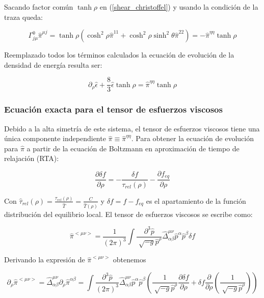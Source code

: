 \documentclass[11pt,a4paper]{article}
\begin{document}
Sacando factor común $\tanh\rho$ en (\ref{shear_christoffel}) y usando la condición de la traza queda:


\begin{equation}
\Gamma^{0}_{{j}{\mu}}\hat{\pi}^{{\mu}{j}}= \tanh\rho(\cosh^2\rho\hat{\pi}^{{1}{1}}+\cosh^2\rho\sinh^2\theta\hat{\pi}^{{2}{2}})=-\hat{\pi}^{{\eta}{\eta}}\tanh\rho
\end{equation}


Reemplazado todos los términos calculados la ecuación de evolución de la densidad de energía resulta ser:

\begin{equation}
\partial_{\rho}\hat{\epsilon}+\frac{8}{3}\hat{\epsilon}\tanh\rho=\hat{\pi}^{{\eta}{\eta}}\tanh\rho
\label{ecuacion_energia}
\end{equation}

\subsubsection{Ecuación exacta para el tensor de esfuerzos viscosos}

Debido a la alta simetría de este sistema, el tensor de esfuerzos viscosos tiene una única componente independiente $\hat{\pi}\equiv\hat{\pi}^{{\eta}{\eta}}$. Para obtener la ecuación de evolución para $\hat{\pi}$ a partir de la ecuación de Boltzmann en aproximación de tiempo de relajación (RTA):

\begin{equation}
\frac{\partial\delta{f}}{\partial\rho}=-\frac{\delta{f}}{\tau_{rel}(\rho)}-\frac{\partial{f}_{eq}}{\partial\rho}
\end{equation}

Con $\hat{\tau}_{rel}(\rho)=\frac{\tau_{rel}(\rho)}{\hat{T}}=\frac{C}{\hat{T}(\rho)}$ y $\delta{f}=f-f_{eq}$ es el apartamiento de la función distribución del equilibrio local. El tensor de esfuerzos viscosos se escribe como:

\begin{equation}
\hat{\pi}^{<{\mu}{\nu}>}=\frac{1}{(2\pi)^3}\int{\frac{\partial^3\hat{p}}{\sqrt[]{-g}\hat{p}^{\rho}}}\hat{\Delta}^{{\mu}{\nu}}_{{\alpha}{\beta}}\hat{p}^{\alpha}\hat{p}^{\beta}\delta{f}
\label{boltzmann_df}
\end{equation}

Derivando la expresión de $\hat{\pi}^{<{\mu}{\nu}>}$ obtenemos

\begin{equation}
\partial_{\rho}\hat{\pi}^{<{\mu}{\nu}>}=
\hat{\Delta}^{{\mu}{\nu}}_{{\alpha}{\beta}}\partial_{\rho}\hat{\pi}^{{\alpha}{\beta}}=
\int{\frac{\partial^3\hat{p}}{(2\pi)^3}}\hat{\Delta}^{{\mu}{\nu}}_{{\alpha}{\beta}}\hat{p}^{\alpha}\hat{p}^{\beta}(\frac{1}{\sqrt[]{-g}\hat{p}^{\rho}}\frac{\partial\delta{f}}{\partial\rho}+\delta{f}\frac{\partial}{\partial\rho}(\frac{1}{\sqrt[]{-g}\hat{p}^{\rho}}))
\label{derivada_shear}
\end{equation}
\end{document}
